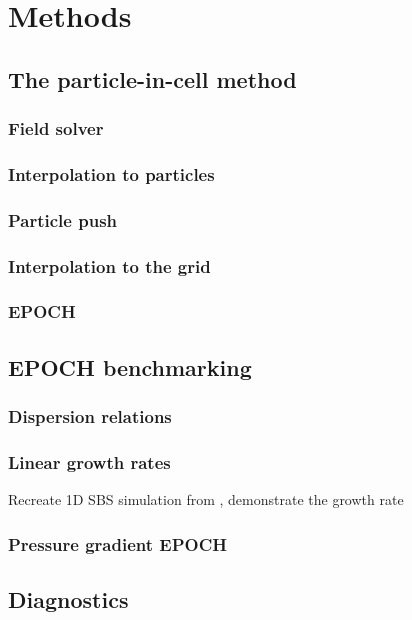 \chapter{Methods}
\label{chp:methods}

\section{The particle-in-cell method}
\subsection{Field solver}
\subsection{Interpolation to particles}
\subsection{Particle push}
\subsection{Interpolation to the grid}
\subsection{EPOCH}


\section{EPOCH benchmarking}
\subsection{Dispersion relations}
\subsection{Linear growth rates}
Recreate 1D SBS simulation from \cite{Forslund1975}, demonstrate the growth rate
\subsection{Pressure gradient EPOCH}

\section{Diagnostics}
